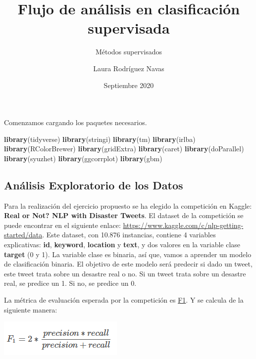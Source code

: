 \documentclass[
]{article}
\title{Flujo de análisis en clasificación supervisada}
\subtitle{Métodos supervisados}
\author{Laura Rodríguez Navas}
\date{Septiembre 2020}
\newenvironment{Shaded}{\begin{snugshade}}{\end{snugshade}}
\newcommand{\KeywordTok}[1]{\textcolor[rgb]{0.13,0.29,0.53}{\textbf{#1}}}
\newcommand{\NormalTok}[1]{#1}
\begin{document}
\maketitle

{
\setcounter{tocdepth}{2}
\tableofcontents
}
Comenzamos cargando los paquetes necesarios.

\begin{Shaded}
\begin{Highlighting}[]
\KeywordTok{library}\NormalTok{(tidyverse)}
\KeywordTok{library}\NormalTok{(stringi)}
\KeywordTok{library}\NormalTok{(tm)}
\KeywordTok{library}\NormalTok{(irlba)}
\KeywordTok{library}\NormalTok{(RColorBrewer)}
\KeywordTok{library}\NormalTok{(gridExtra)}
\KeywordTok{library}\NormalTok{(caret)}
\KeywordTok{library}\NormalTok{(doParallel)}
\KeywordTok{library}\NormalTok{(syuzhet)}
\KeywordTok{library}\NormalTok{(ggcorrplot)}
\KeywordTok{library}\NormalTok{(gbm)}
\end{Highlighting}
\end{Shaded}

\hypertarget{anuxe1lisis-exploratorio-de-los-datos}{%
\subsection{Análisis Exploratorio de los
Datos}\label{anuxe1lisis-exploratorio-de-los-datos}}

Para la realización del ejercicio propuesto se ha elegido la competición
en Kaggle: \textbf{Real or Not? NLP with Disaster Tweets}. El dataset de
la competición se puede encontrar en el siguiente enlace:
\url{https://www.kaggle.com/c/nlp-getting-started/data}. Este dataset,
con 10.876 instancias, contiene 4 variables explicativas: \textbf{id},
\textbf{keyword}, \textbf{location} y \textbf{text}, y dos valores en la
variable clase \textbf{target} (0 y 1). La variable clase es binaria,
así que, vamos a aprender un modelo de clasificación binaria. El
objetivo de este modelo será predecir si dado un tweet, este tweet trata
sobre un desastre real o no. Si un tweet trata sobre un desastre real,
se predice un 1. Si no, se predice un 0.

La métrica de evaluación esperada por la competición es
\href{https://www.kaggle.com/c/nlp-getting-started/overview/evaluation}{F1}.
Y se calcula de la siguiente manera:

\begin{center}\includegraphics[width=0.3\linewidth]{F1_score} \end{center}
\end{document}
